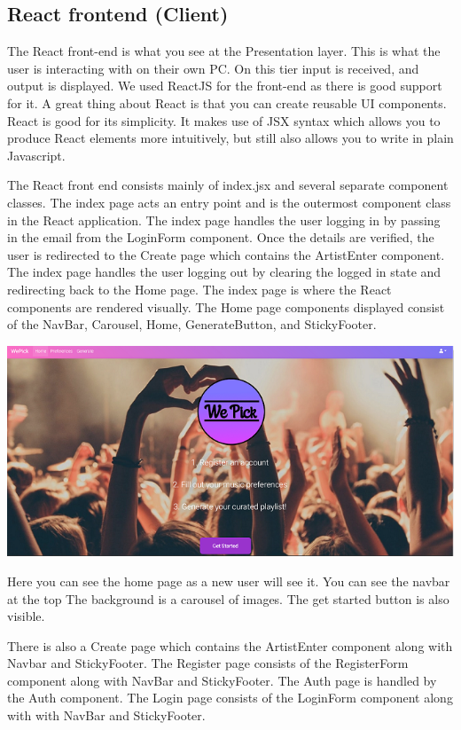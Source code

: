 \subsection{React frontend (Client)}
The React front-end is what you see at the Presentation layer. This is what the user is interacting with on their own PC. On this tier input is received, and output is displayed.
We used ReactJS for the front-end as there is good support for it. A great thing about React is that you can create reusable UI components. React is good for its simplicity. It makes use of JSX syntax which allows you to produce React elements more intuitively, but still also allows you to write in plain Javascript.


The React front end consists mainly of index.jsx and several separate component classes. The index page acts an entry point and is the outermost component class in the React application. The index page handles the user logging in by passing in the email from the LoginForm component. Once the details are verified, the user is redirected to the Create page which contains the ArtistEnter component. The index page handles the user logging out by clearing the logged in state and redirecting back to the Home page. 
The index page is where the React components are rendered visually. The Home page components displayed consist of the NavBar, Carousel, Home, GenerateButton, and StickyFooter. 

\begin{center}    
	\includegraphics{img/WePickHome.png}
\end{center}
Here you can see the home page as a new user will see it. You can see the navbar at the top
The background is a carousel of images. The get started button is also visible.\newline


There is also a Create page which contains the ArtistEnter component along with Navbar and StickyFooter.\newline
The Register page consists of the RegisterForm component along with NavBar and StickyFooter.\newline
The Auth page is handled by the Auth component.\newline
The Login page consists of the LoginForm component along with with NavBar and StickyFooter.\newline


